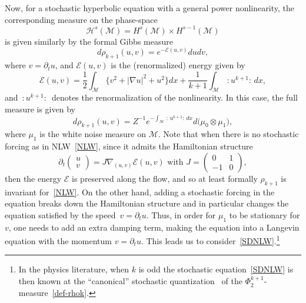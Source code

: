 \documentclass[AHL,Unicode,longabstracts,published]{cedram}
\newcommand{\En}{\mathcal{E}}
\newcommand{\M}{\mathcal{M}}
\renewcommand{\H}{\mathcal{H}}
\newcommand{\dt}{\partial_t}
\begin{document}
Now, for a stochastic hyperbolic equation with a general power nonlinearity, the corresponding measure on the phase-space
\begin{equation*}
\H^s(\M)=H^s(\M)\times H^{s-1}(\M)
\end{equation*}
is given similarly by the formal Gibbs measure
\begin{equation*}
d\rho_{k+1}(u,v) = e^{-\En(u,v)}dudv,
\end{equation*}
where $v=\dt u$, and $\En(u,v)$ is the (renormalized) energy given by
\begin{equation*}
\En(u,v)=\frac12\int_{\M}\big\{v^2 + |\nabla u|^2 + u^2\big\}dx + \frac{1}{k+1}\int_{\M}\,:\!u^{k+1}\!:\,dx,
\end{equation*}
and $\,:\!u^{k+1}\!:\,$ denotes the renormalization of the nonlinearity. In this case, the full measure is given by
\begin{equation}\label{def-rhok}
d\rho_{k+1}(u,v)=Z^{-1}e^{-\int_{\M}\,:\,u^{k+1}:\,dx}d\big(\mu_0\otimes \mu_1\big),
\end{equation}
where $\mu_1$ is the white noise measure on $\M$. Note that when there is no stochastic forcing as in NLW~\eqref{NLW}, since it admits the Hamiltonian structure
\begin{equation*}
\dt
\begin{pmatrix}
u\\v
\end{pmatrix} = J\nabla_{(u,v)}\En(u,v)\text{ with }J=
\begin{pmatrix}0&1\\-1&0
\end{pmatrix},
\end{equation*}
then the energy $\En$ is preserved along the flow, and so at least formally $\rho_{k+1}$ is invariant for~\eqref{NLW}. On the other hand, adding a stochastic forcing in the equation breaks down the Hamiltonian structure and in particular changes the equation satisfied by the speed~$v = \dt u $. Thus, in order for $\mu_1$ to be stationary for $v$, one needs to add an extra damping term, making the equation into a Langevin equation with the momentum $v = \dt u$. This leads us to consider~\eqref{SDNLW}.\footnote{In the physics literature, when $k$ is odd the stochastic equation~\eqref{SDNLW} is then known at the ``canonical'' stochastic quantization~\cite{RSS} of the $\Phi^{k+1}_2$-measure~\eqref{def-rhok}.}
\end{document}

